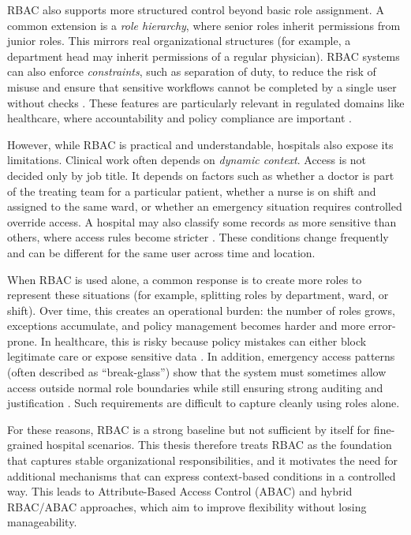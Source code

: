 RBAC also supports more structured control beyond basic role assignment. A common extension is a \textit{role hierarchy}, where senior roles inherit permissions from junior roles. This mirrors real organizational structures (for example, a department head may inherit permissions of a regular physician). RBAC systems can also enforce \textit{constraints}, such as separation of duty, to reduce the risk of misuse and ensure that sensitive workflows cannot be completed by a single user without checks \cite{Sandhu1996, Ferraiolo2007RBAC2E}. These features are particularly relevant in regulated domains like healthcare, where accountability and policy compliance are important \cite{Shin2015}.
\vspace{0.5cm}


However, while RBAC is practical and understandable, hospitals also expose its limitations. Clinical work often depends on \textit{dynamic context}. Access is not decided only by job title. It depends on factors such as whether a doctor is part of the treating team for a particular patient, whether a nurse is on shift and assigned to the same ward, or whether an emergency situation requires controlled override access. A hospital may also classify some records as more sensitive than others, where access rules become stricter \cite{SantosPereira2013}. These conditions change frequently and can be different for the same user across time and location.
\vspace{0.5cm}


When RBAC is used alone, a common response is to create more roles to represent these situations (for example, splitting roles by department, ward, or shift). Over time, this creates an operational burden: the number of roles grows, exceptions accumulate, and policy management becomes harder and more error-prone. In healthcare, this is risky because policy mistakes can either block legitimate care or expose sensitive data \cite{SantosPereira2013, Shin2015}. In addition, emergency access patterns (often described as “break-glass”) show that the system must sometimes allow access outside normal role boundaries while still ensuring strong auditing and justification \cite{SantosPereira2013}. Such requirements are difficult to capture cleanly using roles alone.
\vspace{0.5cm}


For these reasons, RBAC is a strong baseline but not sufficient by itself for fine-grained hospital scenarios. This thesis therefore treats RBAC as the foundation that captures stable organizational responsibilities, and it motivates the need for additional mechanisms that can express context-based conditions in a controlled way. This leads to Attribute-Based Access Control (ABAC) and hybrid RBAC/ABAC approaches, which aim to improve flexibility without losing manageability.


